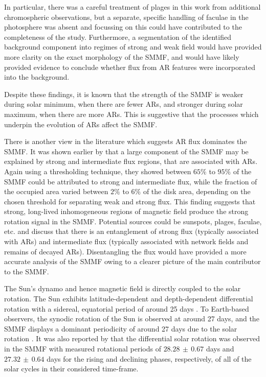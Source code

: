 In particular, there was a careful treatment of plages in this work from additional chromospheric observations, but a separate, specific handling of faculae in the photosphere was absent and focussing on this could have contributed to the completeness of the study. Furthermore, a segmentation of the identified background component into regimes of strong and weak field would have provided more clarity on the exact morphology of the SMMF, and would have likely provided evidence to conclude whether flux from AR features were incorporated into the background.

Despite these findings, it is known that the strength of the SMMF is weaker during solar minimum, when there are fewer ARs, and stronger during solar maximum, when there are more ARs. This is suggestive that the processes which underpin the evolution of ARs affect the SMMF.

There is another view in the literature which suggests AR flux dominates the SMMF. It was shown earlier by \citet{kutsenko_contribution_2017} that a large component of the SMMF may be explained by strong and intermediate flux regions, that are associated with ARs. Again using a thresholding technique, they showed between $65 \%$ to $95 \%$ of the SMMF could be attributed to strong and intermediate flux, while the fraction of the occupied area varied between $2 \%$ to $6 \%$ of the disk area, depending on the chosen threshold for separating weak and strong flux. This finding suggests that strong, long-lived inhomogeneous regions of magnetic field produce the strong rotation signal in the SMMF. Potential sources could be sunspots, plages, faculae, etc. and \citet{kutsenko_contribution_2017} discuss that there is an entanglement of strong flux (typically associated with ARs) and intermediate flux (typically associated with network fields and remains of decayed ARs). Disentangling the flux would have provided a more accurate analysis of the SMMF owing to a clearer picture of the main contributor to the SMMF.

The Sun's dynamo and hence magnetic field is directly coupled to the solar rotation. The Sun exhibits latitude-dependent and depth-dependent differential rotation with a sidereal, equatorial period of around 25 days \citep{howe_solar_2009}. To Earth-based observers, the synodic rotation of the Sun is observed at around 27 days, and the SMMF displays a dominant periodicity of around 27 days due to the solar rotation \citep{chaplin_studies_2003, xie_temporal_2017, bose_variability_2018}. It was also reported by \citet{xie_temporal_2017} that the differential solar rotation was observed in the SMMF with measured rotational periods of $28.28 \, \pm \, 0.67$ days and $27.32 \, \pm \, 0.64$ days for the rising and declining phases, respectively, of all of the solar cycles in their considered time-frame.

